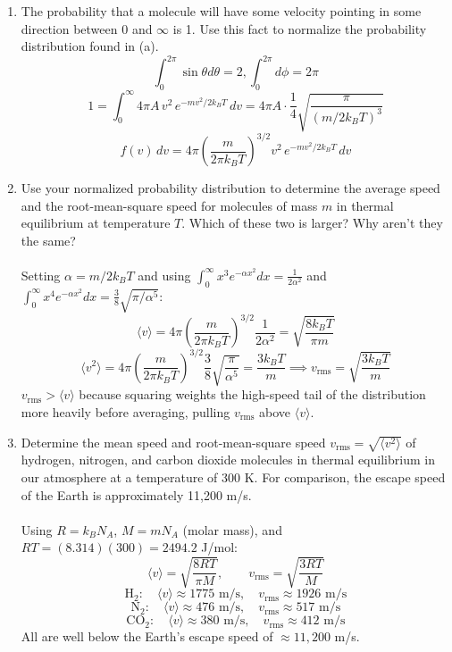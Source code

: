 \documentclass{article}
\begin{document}
\begin{enumerate}
\begin{enumerate}
            \item The probability that a molecule will have some velocity pointing in some direction between 0 and $\infty$ is 1. Use this fact to normalize the probability distribution found in (a).
            \\
            \[\int_{0}^{2\pi}\sin\theta d\theta = 2, \int_{0}^{2\pi}d\phi = 2\pi\]
            \[1 = \int_0^\infty 4\pi A\,v^2\,e^{-mv^2/2k_BT}\,dv = 4\pi A\cdot\frac{1}{4}\sqrt{\frac{\pi}{(m/2k_BT)^3}}\]
            \[\boxed{f(v)\,dv = 4\pi\!\left(\frac{m}{2\pi k_BT}\right)^{\!3/2} v^2\,e^{-mv^2/2k_BT}\,dv}\]

            \item Use your normalized probability distribution to determine the average speed and the root-mean-square speed for molecules of mass $m$ in thermal equilibrium at temperature $T$. Which of these two is larger? Why aren't they the same?
            \\
            \\Setting $\alpha = m/2k_BT$ and using $\int_0^\infty x^3 e^{-\alpha x^2}dx = \frac{1}{2\alpha^2}$ and $\int_0^\infty x^4 e^{-\alpha x^2}dx = \frac{3}{8}\sqrt{\pi/\alpha^5}$:
            \[\langle v\rangle = 4\pi\!\left(\frac{m}{2\pi k_BT}\right)^{\!3/2}\frac{1}{2\alpha^2} = \boxed{\sqrt{\frac{8k_BT}{\pi m}}}\]
            \[\langle v^2\rangle = 4\pi\!\left(\frac{m}{2\pi k_BT}\right)^{\!3/2}\frac{3}{8}\sqrt{\frac{\pi}{\alpha^5}} = \frac{3k_BT}{m} \implies \boxed{v_\text{rms} = \sqrt{\frac{3k_BT}{m}}}\]
            $v_\text{rms} > \langle v\rangle$ because squaring weights the high-speed tail of the distribution more heavily before averaging, pulling $v_\text{rms}$ above $\langle v\rangle$.

            \item Determine the mean speed and root-mean-square speed $v_\text{rms} = \sqrt{\langle v^2\rangle}$ of hydrogen, nitrogen, and carbon dioxide molecules in thermal equilibrium in our atmosphere at a temperature of 300 K. For comparison, the escape speed of the Earth is approximately 11,200 m/s.
            \\
            \\Using $R = k_BN_A$, $M = mN_A$ (molar mass), and $RT = (8.314)(300) = 2494.2$ J/mol:
            \[\langle v\rangle = \sqrt{\frac{8RT}{\pi M}}, \qquad v_\text{rms} = \sqrt{\frac{3RT}{M}}\]
            \[\text{H}_2:\quad \langle v\rangle \approx \boxed{1775\text{ m/s}}, \quad v_\text{rms} \approx \boxed{1926\text{ m/s}}\]
            \[\text{N}_2:\quad \langle v\rangle \approx \boxed{476\text{ m/s}}, \quad v_\text{rms} \approx \boxed{517\text{ m/s}}\]
            \[\text{CO}_2:\quad \langle v\rangle \approx \boxed{380\text{ m/s}}, \quad v_\text{rms} \approx \boxed{412\text{ m/s}}\]
            All are well below the Earth's escape speed of $\approx 11{,}200$ m/s.


\end{enumerate}
\end{enumerate}
\end{document}
